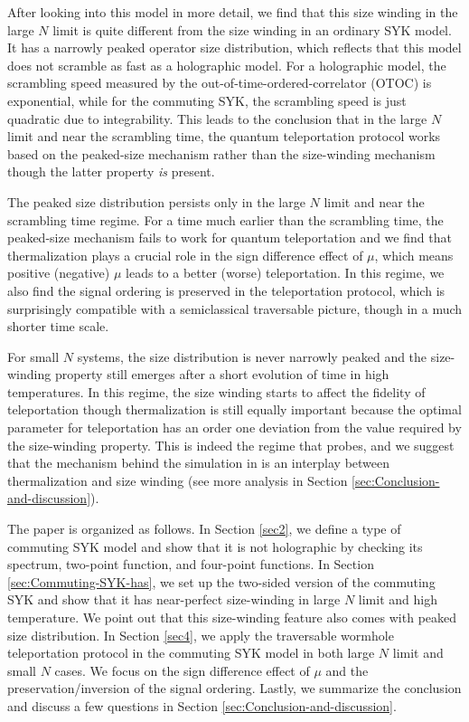 \documentclass[11pt]{article}
\renewcommand{\>}{\rangle}
\newcommand{\<}{\langle}
\begin{document}
After looking into this model in more detail, we find that this size winding in the large $N$ limit is quite different from the size winding in an ordinary SYK model. It has a narrowly peaked operator size distribution, which reflects that this model does not scramble as fast as a holographic model. For a holographic model, the scrambling speed measured by the out-of-time-ordered-correlator (OTOC) is exponential, while for the commuting SYK, the scrambling speed is just quadratic due to integrability. This leads to the conclusion that in the large $N$ limit and near the scrambling time, the quantum teleportation protocol works based on the peaked-size mechanism \cite{Schuster:2021uvg} rather than the size-winding mechanism though the latter property {\it is} present. 

The peaked size distribution persists only in the large $N$ limit and near the scrambling time regime. For a time much earlier than the scrambling time, the peaked-size mechanism fails to work for quantum teleportation and we find that thermalization plays a crucial role in the sign difference effect of $\mu$, which means positive (negative) $\mu$ leads to a better (worse) 
 teleportation. In this regime, we also find the signal ordering is preserved in the teleportation protocol, which is surprisingly compatible with a semiclassical traversable picture, though in a much shorter time scale.
 
 For small $N$ systems, the size distribution is never narrowly peaked and the size-winding property still emerges after a short evolution of time in high temperatures. In this regime, the size winding starts to affect the fidelity of teleportation though thermalization is still equally important because the optimal parameter for teleportation has an order one deviation from the value required by the size-winding property. This is indeed the regime that \cite{Jafferis:2022crx} probes, and we suggest that the mechanism behind the simulation in \cite{Jafferis:2022crx} is an interplay between thermalization and size winding (see more analysis in Section \ref{sec:Conclusion-and-discussion}).

The paper is organized as follows. In Section \ref{sec2}, we define a type of commuting SYK model and show that it is not holographic by checking its spectrum, two-point function, and four-point functions. In Section \ref{sec:Commuting-SYK-has}, we set up the two-sided version of the commuting SYK and show that it has near-perfect size-winding in large $N$ limit and high temperature. We point out that this size-winding feature also comes with peaked size distribution. In Section \ref{sec4}, we apply the traversable wormhole teleportation protocol in the commuting SYK model in both large $N$ limit and small $N$ cases. We focus on the sign difference effect of $\mu$ and the preservation/inversion of the signal ordering. Lastly, we summarize the conclusion and discuss a few questions in Section \ref{sec:Conclusion-and-discussion}.
\end{document}
